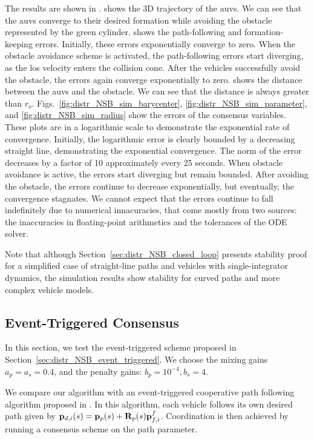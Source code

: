 The results are shown in .
 shows the 3D trajectory of the \glspl{auv}. We can see that the \glspl{auv} converge to their desired formation while avoiding the obstacle represented by the green cylinder.
 shows the path-following and formation-keeping errors. Initially, these errors exponentially converge to zero. When the obstacle avoidance scheme is activated, the path-following errors start diverging, as the \gls{los} velocity enters the collision cone. After the vehicles successfully avoid the obstacle, the errors again converge exponentially to zero.
 shows the distance between the \glspl{auv} and the obstacle. We can see that the distance is always greater than $r_o$.
Figs.~\ref{fig:distr_NSB_sim_barycenter}, \ref{fig:distr_NSB_sim_parameter}, and \ref{fig:distr_NSB_sim_radius} show the errors of the consensus variables. These plots are in a logarithmic scale to demonstrate the exponential rate of convergence. Initially, the logarithmic error is clearly bounded by a decreasing straight line, demonstrating the exponential convergence. The norm of the error decreases by a factor of 10 approximately every 25 seconds. When obstacle avoidance is active, the errors start diverging but remain bounded. After avoiding the obstacle, the errors continue to decrease exponentially, but eventually, the convergence stagnates. We cannot expect that the errors continue to fall indefinitely due to numerical innacuracies, that come mostly from two sources: the inaccuracies in floating-point arithmetics and the tolerances of the ODE solver.

Note that although Section~\ref{sec:distr_NSB_closed_loop} presents stability proof for a simplified case of straight-line paths and vehicles with single-integrator dynamics, the simulation results show stability for curved paths and more complex vehicle models.

\subsection{Event-Triggered Consensus}

In this section, we test the event-triggered scheme proposed in Section~\ref{sec:distr_NSB_event_triggered}.
We choose the mixing gains $a_p = a_s = 0.4$, and the penalty gains: $b_p = 10^{-4}, b_s = 4$.

We compare our algorithm with an event-triggered cooperative path following algorithm proposed in \cite{praveen_cooperative_2018}.
In this algorithm, each vehicle follows its own desired path given by $\mathbf{p}_{d,i}(s) = \mathbf{p}_p(s) + \mathbf{R}_p(s) \mathbf{p}_{f, i}^f$.
Coordination is then achieved by running a consensus scheme on the path parameter.

